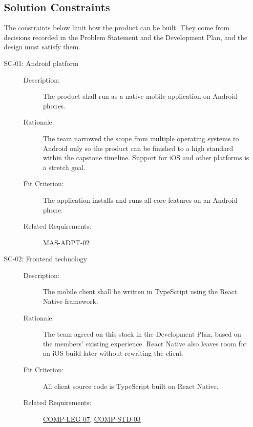 \documentclass[12pt]{article}
\begin{document}
\subsection{Solution Constraints}

The constraints below limit how the product can be built. They come from
decisions recorded in the Problem Statement and the Development Plan, and the
design must satisfy them.

\begin{description}
  \item[{SC-01\hypertarget{req:SC-01}{}}: Android platform]\leavevmode
  \begin{description}
    \item[Description:] The product shall run as a native mobile application
    on Android phones.
    \item[Rationale:] The team narrowed the scope from multiple operating
    systems to Android only so the product can be finished to a high standard
    within the capstone timeline. Support for iOS and other platforms is a
    stretch goal.
    \item[Fit Criterion:] The application installs and runs all core features
    on an Android phone.
    \item[Related Requirements:] \hyperlink{req:MAS-ADPT-02}{MAS-ADPT-02}
  \end{description}

  \item[{SC-02\hypertarget{req:SC-02}{}}: Frontend technology]\leavevmode
  \begin{description}
    \item[Description:] The mobile client shall be written in TypeScript using
    the React Native framework.
    \item[Rationale:] The team agreed on this stack in the Development Plan,
    based on the members' existing experience. React Native also leaves room
    for an iOS build later without rewriting the client.
    \item[Fit Criterion:] All client source code is TypeScript built on React
    Native.
    \item[Related Requirements:] \hyperlink{req:COMP-LEG-07}{COMP-LEG-07}, \hyperlink{req:COMP-STD-03}{COMP-STD-03}
  \end{description}


\end{description}
\end{document}
